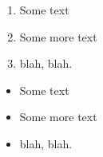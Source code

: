 
\begin{enumerate}
  \item Some text
   \item Some more text
   \item blah, blah.
\end{enumerate}

\begin{itemize}
   \item Some text
   \item Some more text
   \item blah, blah.
\end{itemize}

